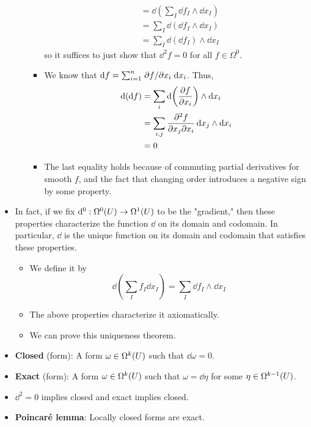 \documentclass[../notes.tex]{subfiles}
\begin{document}
\begin{itemize}
\begin{enumerate}
\begin{itemize}
\begin{align*}
                &= \dd(\sum_I\dd{f_I}\wedge\dd{x_I})\\
                &= \sum_I\dd(\dd{f_I}\wedge\dd{x_I})\tag*{Property 1}\\
                &= \sum_I\dd(\dd{f_I})\wedge\dd{x_I}\tag*{Property 2}
            \end{align*}
            so it suffices to just show that $\dd^2f=0$ for all $f\in\Omega^0$.
            \item We know that $\dd{f}=\sum_{i=1}^n\pdv*{f}{x_i}\dd{x_i}$. Thus,
            \begin{align*}
                \dd(\dd{f}) &= \sum_i\dd(\pdv{f}{x_i})\wedge\dd{x_i}\\
                &= \sum_{i,j}\pdv{f}{x_j}{x_i}\dd{x_j}\wedge\dd{x_i}\\
                &= 0
            \end{align*}
            \item The last equality holds because of commuting partial derivatives for smooth $f$, and the fact that changing order introduces a negative sign by some property.
        \end{itemize}
    \end{enumerate}
    \item In fact, if we fix $\dd^0:\ome[0]{U}\to\ome[1]{U}$ to be the "gradient," then these properties characterize the function $\dd$ on its domain and codomain. In particular, $\dd$ is the unique function on its domain and codomain that satisfies these properties.
    \begin{itemize}
        \item We define it by
        \begin{equation*}
            \dd{\left( \sum_If_I\dd{x_I} \right)} = \sum_I\dd{f_I}\wedge\dd{x_I}
        \end{equation*}
        \item The above properties characterize it axiomatically.
        \item We can prove this uniqueness theorem.
    \end{itemize}
    \item \textbf{Closed} (form): A form $\omega\in\ome[k]{U}$ such that $\dd{\omega}=0$.
    \item \textbf{Exact} (form): A form $\omega\in\ome[k]{U}$ such that $\omega=\dd{\eta}$ for some $\eta\in\ome[k-1]{U}$.
    \item $\dd^2=0$ implies closed and exact implies closed.
    \item \textbf{Poincar\'{e} lemma}: Locally closed forms are exact.
\end{itemize}
\end{document}
